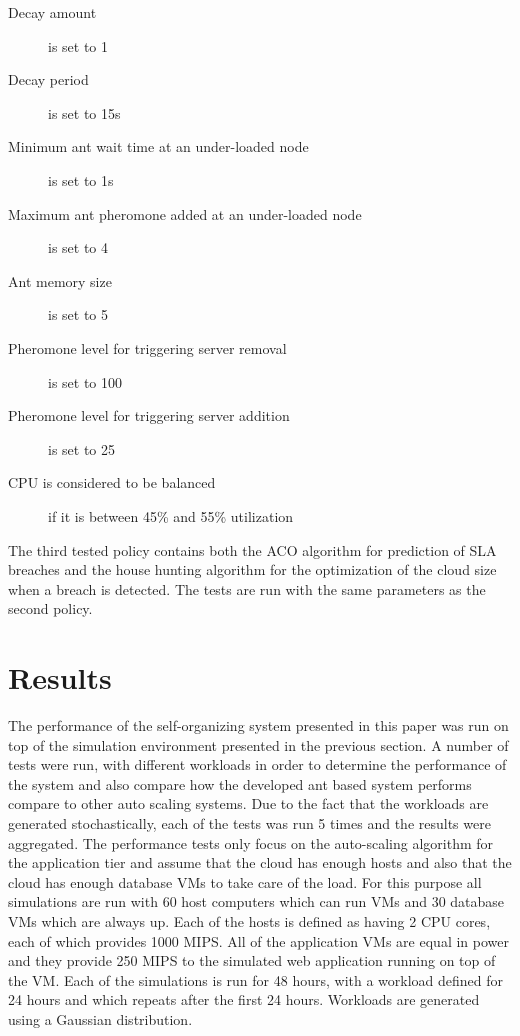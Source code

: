 \documentclass[conference]{IEEEtran}
\begin{document}
\begin{description}
	\item[Decay amount] is set to 1
	\item[Decay period] is set to 15s
	\item[Minimum ant wait time at an under-loaded node] is set to 1s
	\item[Maximum ant pheromone added at an under-loaded node] is set to 4
	\item[Ant memory size] is set to 5
	\item[Pheromone level for triggering server removal] is set to 100
	\item[Pheromone level for triggering server addition] is set to 25
	\item[CPU is considered to be balanced] if it is between 45\% and 55\% utilization
\end{description}

The third tested policy contains both the ACO algorithm for prediction of SLA breaches and the house hunting algorithm for the optimization of the cloud size when a breach is detected. The tests are run with the same parameters as the second policy.

\section{Results}
\label{sec:results}

The performance of the self-organizing system presented in this paper was run on top of the simulation environment presented in the previous section. A number of tests were run, with different workloads in order to determine the performance of the system and also compare how the developed ant based system performs compare to other auto scaling systems. Due to the fact that the workloads are generated stochastically, each of the tests was run 5 times and the results were aggregated. The performance tests only focus on the auto-scaling algorithm for the application tier and assume that the cloud has enough hosts and also that the cloud has enough database VMs to take care of the load. For this purpose all simulations are run with 60 host computers which can run VMs and 30 database VMs which are always up. Each of the hosts is defined as having 2 CPU cores, each of which provides 1000 MIPS. All of the application VMs are equal in power and they provide 250 MIPS to the simulated web application running on top of the VM. Each of the simulations is run for 48 hours, with a workload defined for 24 hours and which repeats after the first 24 hours. Workloads are generated using a Gaussian distribution.
\end{document}
